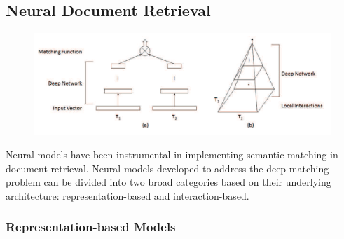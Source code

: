 \subsection{Neural Document Retrieval}
\label{neural-retrieval}

\begin{figure}[t!]
\centering
  \includegraphics[width=6in]{deep_matching.png}
\caption{\cite{guo2017drmm}}
\label{fig:deep_matching}
\end{figure}

Neural models have been instrumental in implementing semantic matching in document retrieval.
Neural models developed to address the deep matching problem can be divided into two broad categories based on their underlying architecture: representation-based and interaction-based.

\subsubsection{Representation-based Models}

